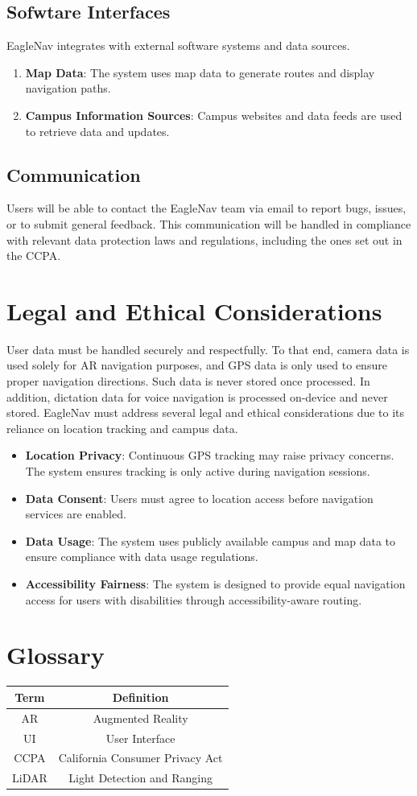\documentclass{article}
\begin{document}
\subsection{Sofwtare Interfaces}
EagleNav integrates with external software systems and data sources.

\begin{enumerate}
	\item \textbf{Map Data}: The system uses map data to generate routes and display navigation paths.
	\item \textbf{Campus Information Sources}: Campus websites and data feeds are used to retrieve data and updates.
\end{enumerate}

\subsection{Communication}
Users will be able to contact the EagleNav team via email to report bugs, issues, or to submit general feedback. This communication will be handled in compliance with relevant data protection laws and regulations, including the ones set out in the CCPA.


\section{Legal and Ethical Considerations}
User data must be handled securely and respectfully. To that end, camera data is used solely for AR navigation purposes, and GPS data is only used to ensure proper navigation directions. Such data is never stored once processed.
In addition, dictation data for voice navigation is processed on-device and never stored.
EagleNav must address several legal and ethical considerations due to its reliance on location tracking and campus data.

\begin{itemize}
    \item \textbf{Location Privacy}: Continuous GPS tracking may raise privacy concerns. The system ensures tracking is only active during navigation sessions.
    \item \textbf{Data Consent}: Users must agree to location access before navigation services are enabled.
    \item \textbf{Data Usage}: The system uses publicly available campus and map data to ensure compliance with data usage regulations.
    \item \textbf{Accessibility Fairness}: The system is designed to provide equal navigation access for users with disabilities through accessibility-aware routing.
\end{itemize}

\section{Glossary}
\begin{table}[h!]
	\begin{tabular}{|c|c|}
		\hline
		\textbf{Term} &\textbf{Definition}\\
		\hline
		AR & Augmented Reality \\
		UI & User Interface \\
		CCPA & California Consumer Privacy Act \\
		LiDAR &Light Detection and Ranging \\
		\hline
	\end{tabular}
\end{table}
\end{document}
